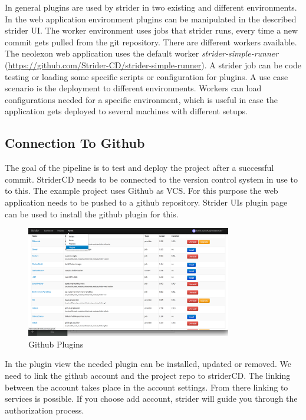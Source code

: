 In general plugins are used by strider in two existing and different environments. In the web application environment plugins can be manipulated
in the described strider UI. The worker environment uses jobs that strider runs, every time a new commit gets pulled from the git
repository. There are different workers available. The neolexon web application uses the default worker \textit{strider-simple-runner}
(\url{https://github.com/Strider-CD/strider-simple-runner}). A strider job can be code testing or loading some specific scripts or
configuration for plugins. A use case scenario is the deployment to different environments. Workers can load configurations needed for
a specific environment, which is useful in case the application gets deployed to several machines with different setups.

\subsection{Connection To Github}
\label{subsection:Connection To Github}
The goal of the pipeline is to test and deploy the project after a successful commit. StriderCD needs to be connected to the version
control system in use to to this. The example project uses Github as VCS. For this purpose the web application needs to be pushed to a github repository.
Strider UIs plugin page can be used to install the github plugin for this.

\begin{figure}[h!]
  \centering
  \includegraphics[width=0.8\textwidth]{images/plugin_page.png}
  \caption{Github Plugins}
\end{figure}

In the plugin view the needed plugin can be installed, updated or removed. We need to link the github account and the project repo to striderCD.
The linking between the account takes place in the account settings. From there linking to services is possible. If you choose add account, strider
will guide you through the authorization process.

